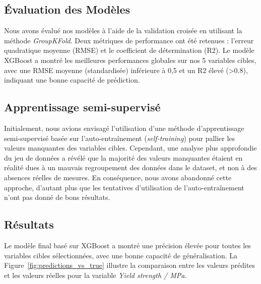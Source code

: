 \documentclass{article}
\begin{document}
\subsection{Évaluation des Modèles}

Nous avons évalué nos modèles à l’aide de la validation croisée en utilisant la méthode \textit{GroupKFold}. Deux métriques de performance ont été retenues : l’erreur quadratique moyenne (RMSE) et le coefficient de détermination (R2). Le modèle XGBoost a montré les meilleures performances globales sur nos 5 variables cibles, avec une RMSE moyenne (standardisée) inférieure à 0,5 et un R2 élevé (>0.8), indiquant une bonne capacité de prédiction.

\subsection{Apprentissage semi-supervisé}

Initialement, nous avions envisagé l’utilisation d’une méthode d’apprentissage semi-supervisé basée sur l’auto-entraînement (\textit{self-training}) pour pallier les valeurs manquantes des variables cibles. Cependant, une analyse plus approfondie du jeu de données a révélé que la majorité des valeurs manquantes étaient en réalité dues à un mauvais regroupement des données dans le dataset, et non à des absences réelles de mesures. En conséquence, nous avons abandonné cette approche, d’autant plus que les tentatives d’utilisation de l’auto-entraînement n’ont pas donné de bons résultats.

\subsection{Résultats}

Le modèle final basé sur XGBoost a montré une précision élevée pour toutes les variables cibles sélectionnées, avec une bonne capacité de généralisation. La Figure~\ref{fig:predictions_vs_true} illustre la comparaison entre les valeurs prédites et les valeurs réelles pour la variable \textit{Yield strength / MPa}.
\end{document}
